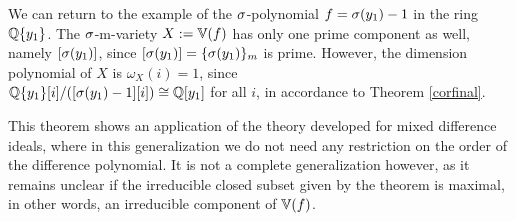 \begin{theorem}
\begin{bew}
\end{bew}
\end{theorem}

\begin{ex}
We can return to the example of the $\sigma$-polynomial $f = \sigma(y_1) - 1$ in the ring $\mathbb{Q}\{y_1\}$. The $\sigma$-m-variety $X:= \mathbb{V}(f)$ has only one prime component as well, namely $[\sigma(y_1)]$, since $[\sigma(y_1)] = \{ \sigma(y_1) \}_m$ is prime.
However, the dimension polynomial of $X$ is $\omega_X(i) = 1$, since \\ $\mathbb{Q}\{y_1\}[i]/([\sigma(y_1) - 1][i]) \cong \mathbb{Q}[y_1]$ for all $i$, in accordance to Theorem \ref{corfinal}.
\end{ex}


This theorem shows an application of the theory developed for mixed difference ideals, where in this generalization we do not need any restriction on the order of the difference polynomial.
It is not a complete generalization however, as it remains unclear if the irreducible closed subset given by the theorem is maximal, in other words, an irreducible component of $\mathbb{V}(f)$.




